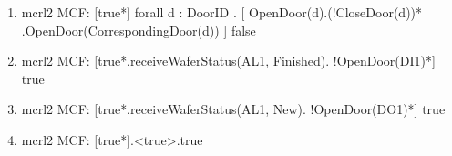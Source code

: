 \documentclass[a4paper,12pt]{article}
\begin{document}
\begin{enumerate}
		\item mcrl2 MCF: [true*] forall d : DoorID . [ OpenDoor(d).(!CloseDoor(d))*
		\\.OpenDoor(CorrespondingDoor(d)) ] false
		
		\item mcrl2 MCF: [true*.receiveWaferStatus(AL1, Finished). !OpenDoor(DI1)*] true
		
		
		\item mcrl2 MCF: [true*.receiveWaferStatus(AL1, New). !OpenDoor(DO1)*] true
		
		\item mcrl2 MCF: [true*].<true>.true
		
	\end{enumerate}
\end{document}

